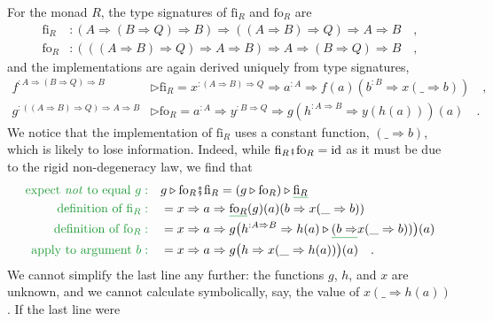 For the monad $R$, the type signatures of $\text{fi}_{R}$ and $\text{fo}_{R}$
are
\begin{align*}
\text{fi}_{R} & :\left(A\Rightarrow\left(B\Rightarrow Q\right)\Rightarrow B\right)\Rightarrow\left(\left(A\Rightarrow B\right)\Rightarrow Q\right)\Rightarrow A\Rightarrow B\quad,\\
\text{fo}_{R} & :\left(\left(\left(A\Rightarrow B\right)\Rightarrow Q\right)\Rightarrow A\Rightarrow B\right)\Rightarrow A\Rightarrow\left(B\Rightarrow Q\right)\Rightarrow B\quad,
\end{align*}
and the implementations are again derived uniquely from type signatures,
\begin{align*}
f^{:A\Rightarrow\left(B\Rightarrow Q\right)\Rightarrow B} & \triangleright\text{fi}_{R}=x^{:\left(A\Rightarrow B\right)\Rightarrow Q}\Rightarrow a^{:A}\Rightarrow f(a)(b^{:B}\Rightarrow x(\_\Rightarrow b))\quad,\\
g^{:\left(\left(A\Rightarrow B\right)\Rightarrow Q\right)\Rightarrow A\Rightarrow B} & \triangleright\text{fo}_{R}=a^{:A}\Rightarrow y^{:B\Rightarrow Q}\Rightarrow g(h^{:A\Rightarrow B}\Rightarrow y(h(a)))(a)\quad.
\end{align*}
We notice that the implementation of $\text{fi}_{R}$ uses a constant
function, $\left(\_\Rightarrow b\right)$, which is likely to lose
information. Indeed, while $\text{fi}_{R}\bef\text{fo}_{R}=\text{id}$
as it must be due to the rigid non-degeneracy law, we find that 
\begin{align*}
{\color{greenunder}\text{expect \emph{not} to equal }g:}\quad & g\triangleright\text{fo}_{R}\bef\text{fi}_{R}=\left(g\triangleright\text{fo}_{R}\right)\triangleright\gunderline{\text{fi}_{R}}\\
{\color{greenunder}\text{definition of }\text{fi}_{R}:}\quad & =x\Rightarrow a\Rightarrow\gunderline{\text{fo}_{R}}(g)(a)(b\Rightarrow x(\_\Rightarrow b))\\
{\color{greenunder}\text{definition of }\text{fo}_{R}:}\quad & =x\Rightarrow a\Rightarrow g\big(h^{:A\Rightarrow B}\Rightarrow h(a)\triangleright\gunderline{(b\Rightarrow}x(\_\Rightarrow b))\big)(a)\\
{\color{greenunder}\text{apply to argument }b:}\quad & =x\Rightarrow a\Rightarrow g\big(h\Rightarrow x(\_\Rightarrow h(a))\big)(a)\quad.
\end{align*}
We cannot simplify the last line any further: the functions $g$,
$h$, and $x$ are unknown, and we cannot calculate symbolically,
say, the value of $x(\_\Rightarrow h(a))$. If the last line were
